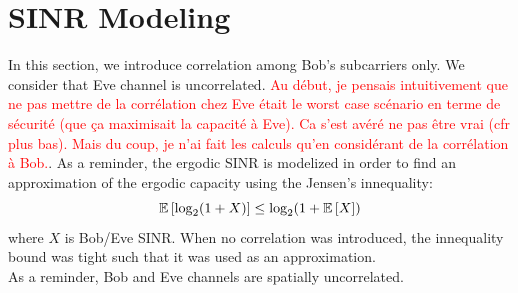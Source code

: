 \documentclass[12pt]{article}
\begin{document}
\section{SINR Modeling}
In this section, we introduce correlation among Bob's subcarriers only. We consider that Eve channel is uncorrelated. \textcolor{red}{Au début, je pensais intuitivement que ne pas mettre de la corrélation chez Eve était le worst case scénario en terme de sécurité (que ça maximisait la capacité à Eve). Ca s'est avéré ne pas être vrai (cfr plus bas). Mais du coup, je n'ai fait les calculs qu'en considérant de la corrélation à Bob.}. As a reminder, the ergodic SINR is modelized in order to find an approximation of the ergodic capacity using the Jensen's innequality:
\begin{equation}
	\mathbb{E} \left[\log_2(1+X)\right] \leq \log_2(1+\mathbb{E} \left[X\right]) 
	\label{eq:jensen_innequality}
\end{equation}
where $X$ is Bob/Eve SINR. When no correlation was introduced, the innequality bound was tight such that it was used as an approximation. \\
As a reminder, Bob and Eve channels are spatially uncorrelated. 
\end{document}
